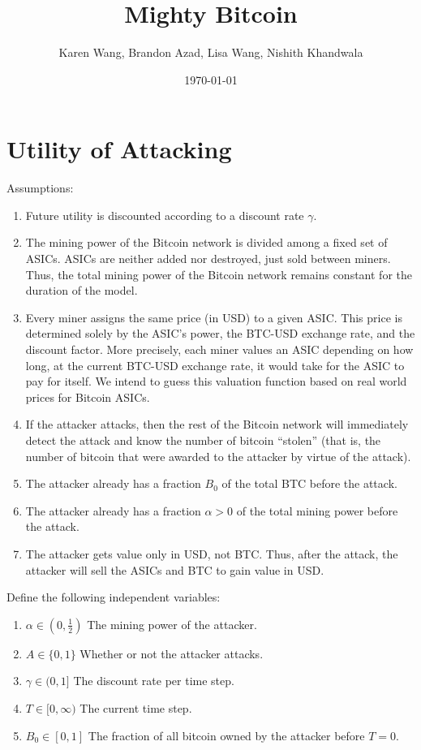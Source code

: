 \documentclass[12pt]{article}
\title{Mighty Bitcoin}
\author{Karen Wang, Brandon Azad, Lisa Wang, Nishith Khandwala}
\date{\today}
\newcommand*{\Attack}{A}
\newcommand*{\Time}{T}
\newcommand*{\ABtcOrig}{{B_0}}
\newenvironment{defs}
  { \begin{enumerate}[labelindent=0pt,labelwidth=2.5in,itemindent=0em,align=parleft,leftmargin=!] }
  { \end{enumerate} }
\begin{document}
\maketitle

\section{Utility of Attacking}

Assumptions:
\begin{enumerate}
  \item
    Future utility is discounted according to a discount rate $\gamma$.
  \item
    The mining power of the Bitcoin network is divided among a fixed set of
    ASICs. ASICs are neither added nor destroyed, just sold between miners.
    Thus, the total mining power of the Bitcoin network remains constant for
    the duration of the model.
  \item
    Every miner assigns the same price (in USD) to a given ASIC. This price is
    determined solely by the ASIC's power, the BTC-USD exchange rate, and the
    discount factor.
    More precisely, each miner values an ASIC depending on how long, at the
    current BTC-USD exchange rate, it would take for the ASIC to pay for
    itself. We intend to guess this valuation function based on real world
    prices for Bitcoin ASICs.
  \item
    If the attacker attacks, then the rest of the Bitcoin network will
    immediately detect the attack and know the number of bitcoin ``stolen''
    (that is, the number of bitcoin that were awarded to the attacker by virtue
    of the attack).
  \item
    The attacker already has a fraction $\ABtcOrig$ of the total BTC
    before the attack.
  \item
    The attacker already has a fraction $\alpha > 0$ of the total mining power
    before the attack.
  \item
    The attacker gets value only in USD, not BTC. Thus, after the attack, the
    attacker will sell the ASICs and BTC to gain value in USD.
\end{enumerate}

Define the following independent variables:

\begin{defs}
  \item[{$\alpha \in (0, \frac{1}{2})$}]
    The mining power of the attacker.
  \item[{$\Attack \in \{0, 1\}$}]
    Whether or not the attacker attacks.
  \item[{$\gamma \in (0, 1]$}]
    The discount rate per time step.
  \item[{$\Time \in [0, \infty)$}]
    The current time step.
  \item[{$\ABtcOrig \in [0, 1]$}]
    The fraction of all bitcoin owned by the attacker before $T = 0$.
\end{defs}
\end{document}
